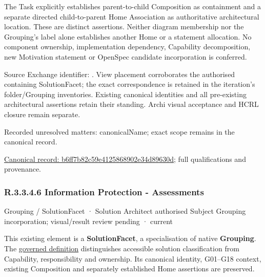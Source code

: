 The Task explicitly establishes parent-to-child Composition as containment and
a separate directed child-to-parent Home Association as authoritative architectural
location. These are distinct assertions. Neither diagram membership nor the
Grouping's label alone establishes another Home or a statement allocation.
No component ownership, implementation dependency, Capability decomposition,
new Motivation statement or OpenSpec candidate incorporation is conferred.



Source Exchange identifier: \texttt{}. View placement corroborates
the authorised containing SolutionFacet; the exact correspondence is retained in the
iteration's folder/Grouping inventories. Existing canonical identities and all
pre-existing architectural assertions retain their standing. Archi visual
acceptance and HCRL closure remain separate.


{\small Recorded unresolved matters: canonicalName; exact scope remains in the canonical record.}\par
{\footnotesize \href{../../../../../../../continuum/grouping/b6ff7b82c59e4125868902e34d89630d.md}{Canonical record: b6ff7b82c59e4125868902e34d89630d}; full qualifications and provenance.}\par
\subsubsection*{R.3.3.4.6 Information Protection - Assessments}
\label{navigation:R.3.3.4.6}

\label{element:0caf2fb84f944a6ab3872feb92b9338d}
{\small Grouping / SolutionFacet · Solution Architect authorised Subject Grouping incorporation; visual/result review pending · current}\par

This existing element is a \textbf{SolutionFacet}, a specialisation of native
\textbf{Grouping}. The \href{\detokenize{../../../../../../../governance/continuum-representation.md#solutionfacet-classification--1119-candidate}}{governed definition}
distinguishes accessible solution classification from Capability, responsibility
and ownership. Its canonical identity, G01–G18 context, existing Composition
and separately established Home assertions are preserved.



